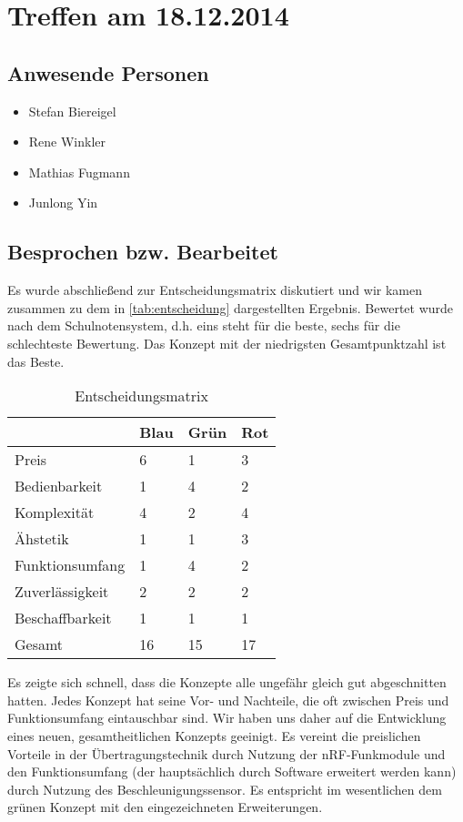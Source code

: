 \chapter{Treffen am 18.12.2014}
\section{Anwesende Personen}
\begin{itemize}
	\item Stefan Biereigel
	\item Rene Winkler
	\item Mathias Fugmann
	\item Junlong Yin
\end{itemize}

\section{Besprochen bzw. Bearbeitet}
Es wurde abschließend zur Entscheidungsmatrix diskutiert und wir kamen zusammen zu dem in \autoref{tab:entscheidung} dargestellten Ergebnis. Bewertet wurde nach dem Schulnotensystem, d.h. eins steht für die beste, sechs für die schlechteste Bewertung. Das Konzept mit der niedrigsten Gesamtpunktzahl ist das Beste.

\begin{table}[H]
\centering
\begin{tabular}{l|l|l|l}
 				& Blau 	& Grün 	& Rot	\\ \hline
Preis			& 6 	& 1		& 3		\\ \hline
Bedienbarkeit	& 1		& 4		& 2		\\ \hline
Komplexität		& 4		& 2		& 4		\\ \hline
Ähstetik		& 1		& 1		& 3		\\ \hline
Funktionsumfang	& 1		& 4		& 2		\\ \hline
Zuverlässigkeit	& 2		& 2		& 2		\\ \hline
Beschaffbarkeit	& 1		& 1		& 1		\\ \hline \hline
Gesamt			& 16	& 15	& 17	\\ \hline
\end{tabular}
\caption{Entscheidungsmatrix}
\label{tab:entscheidung}
\end{table}

Es zeigte sich schnell, dass die Konzepte alle ungefähr gleich gut abgeschnitten hatten. Jedes Konzept hat seine Vor- und Nachteile, die oft zwischen Preis und Funktionsumfang eintauschbar sind. Wir haben uns daher auf die Entwicklung eines neuen, gesamtheitlichen Konzepts geeinigt. 
Es vereint die preislichen Vorteile in der Übertragungstechnik durch Nutzung der nRF-Funkmodule und den Funktionsumfang (der hauptsächlich durch Software erweitert werden kann) durch Nutzung des Beschleunigungssensor. Es entspricht im wesentlichen dem grünen Konzept mit den eingezeichneten Erweiterungen.